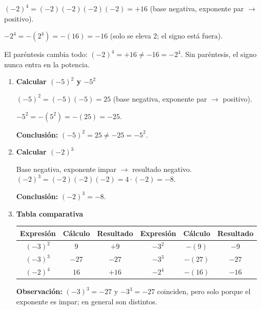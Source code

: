 \documentclass[11pt, letterpaper]{article}
\begin{document}
\begin{tcolorbox}[warningbox, title={Error frecuente --- confundir $(-2)^4$ con $-2^4$}]
$(-2)^4=(-2)(-2)(-2)(-2)=+16$ (base negativa, exponente par $\to$ positivo).

$-2^4=-(2^4)=-(16)=-16$ (solo se eleva 2; el signo est\'a fuera).

El par\'entesis cambia todo: $(-2)^4=+16\neq -16=-2^4$. Sin par\'entesis, el signo nunca entra en la potencia.
\end{tcolorbox}

\begin{tcolorbox}[examplebox, title={Ejemplos --- potencias de base entera}]
\begin{enumerate}[label=\textbf{Ej. \arabic*.}, leftmargin=*, itemsep=12pt]

\item \textbf{Calcular $(-5)^2$ y $-5^2$}

$(-5)^2=(-5)(-5)=25$ (base negativa, exponente par $\to$ positivo).

$-5^2=-(5^2)=-(25)=-25$.

\textbf{Conclusi\'on:} $(-5)^2=25\neq -25=-5^2$.

\item \textbf{Calcular $(-2)^3$}

Base negativa, exponente impar $\to$ resultado negativo. $(-2)^3=(-2)(-2)(-2)=4\cdot(-2)=-8$.

\textbf{Conclusi\'on:} $(-2)^3=-8$.

\item \textbf{Tabla comparativa}

\begin{center}
\renewcommand{\arraystretch}{1.3}
\begin{tabular}{c|c|c||c|c|c}
\toprule
Expresi\'on & C\'alculo & Resultado & Expresi\'on & C\'alculo & Resultado\\
\midrule
$(-3)^2$ & $9$ & $+9$ & $-3^2$ & $-(9)$ & $-9$\\
$(-3)^3$ & $-27$ & $-27$ & $-3^3$ & $-(27)$ & $-27$\\
$(-2)^4$ & $16$ & $+16$ & $-2^4$ & $-(16)$ & $-16$\\
\bottomrule
\end{tabular}
\end{center}

\textbf{Observaci\'on:} $(-3)^3=-27$ y $-3^3=-27$ coinciden, pero solo porque el exponente es impar; en general son distintos.

\end{enumerate}
\end{tcolorbox}
\end{document}
